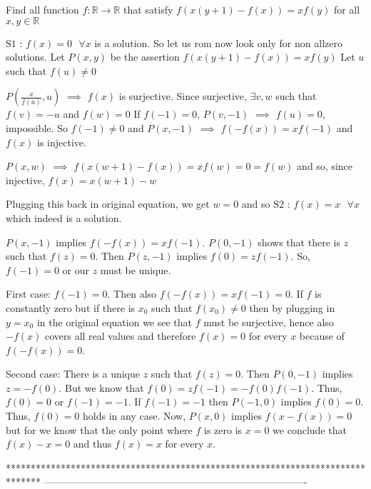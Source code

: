 \begin{solution}
	\begin{tcolorbox}Find all function $f:\mathbb{R}\to\mathbb{R}$ that satisfy $f(x(y+1)-f(x))=xf(y)$ for all $x,y \in \mathbb{R}$\end{tcolorbox}
$\boxed{\text{S1 : }f(x)=0\text{  }\forall x}$ is a solution. So let us rom now look only for non allzero solutions.
Let $P(x,y)$ be the assertion $f(x(y+1)-f(x))=xf(y)$
Let $u$ such that $f(u)\ne 0$

$P(\frac x{f(u)},u)$ $\implies$ $f(x)$ is surjective.
Since surjective, $\exists v,w$ such that $f(v)=-u$ and $f(w)=0$
If $f(-1)=0$, $P(v,-1)$ $\implies$ $f(u)=0$, impossible. So $f(-1)\ne 0$ and $P(x,-1)$ $\implies$ $f(-f(x))=xf(-1)$ and $f(x)$ is injective.

$P(x,w)$ $\implies$ $f(x(w+1)-f(x))=xf(w)=0=f(w)$ and so, since injective, $f(x)=x(w+1)-w$

Plugging this back in original equation, we get $w=0$ and so $\boxed{\text{S2 : }f(x)=x\text{  }\forall x}$ which indeed is a solution.
\end{solution}



\begin{solution}
	$P(x,-1)$ implies $f(-f(x))=xf(-1)$. $P(0,-1)$ shows that there is $z$ such that $f(z)=0$. Then $P(z,-1)$ implies $f(0)=zf(-1)$. So, $f(-1)=0$ or our $z$ must be unique.

First case: $f(-1)=0$. Then also $f(-f(x))=xf(-1)=0$. If $f$ is constantly zero but if there is $x_0$ such that $f(x_0) \ne 0$ then by plugging in $y=x_0$ in the original equation we see that $f$ must be surjective, hence also $-f(x)$ covers all real values and therefore $f(x)=0$ for every $x$ because of $f(-f(x))=0$.

Second case: There is a unique $z$ such that $f(z)=0$.
Then $P(0,-1)$ implies $z=-f(0)$. But we know that $f(0)=zf(-1)=-f(0)f(-1)$. Thus, $f(0)=0$ or $f(-1)=-1$.
If $f(-1)=-1$ then $P(-1,0)$ implies $f(0)=0$. Thus, $f(0)=0$ holds in any case. Now, $P(x,0)$ implies $f(x-f(x))=0$ but for we know that the only point where $f$ is zero is $x=0$ we conclude that $f(x)-x=0$ and thus $f(x)=x$ for every $x$.
\end{solution}
*******************************************************************************
-------------------------------------------------------------------------------

